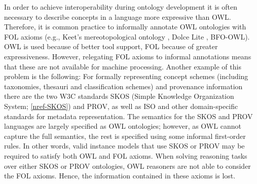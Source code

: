 \documentclass[10pt, a4paper]{isov2}
\renewcommand{\noterefname}{note}
\renewcommand{\nref}[1]{\noterefname~\ref{#1}}
\renewcommand{\nref}[1]{\ref{nref-#1}}
\begin{document}
In order to achieve interoperability during ontology development it is often necessary to describe
concepts in a language more expressive than OWL.  Therefore, it is common practice to informally
annotate OWL ontologies with FOL axioms (e.g., Keet's mereotopological ontology \cite{KeetEtAl12},
Dolce Lite \cite{dolce-web}, BFO-OWL). OWL is used because of better tool support, FOL because of
greater expressiveness. However, relegating FOL axioms to  informal annotations means that these
are not available for machine processing.  Another example of this problem is the following: For
formally representing concept schemes (including taxonomies, thesauri and classification schemes)
and provenance information there are the two W3C standards SKOS (Simple Knowledge Organization
System; \nref{SKOS}) and PROV, as well as ISO and other domain-specific  standards for
metadata representation. The semantics for the SKOS and PROV languages are largely specified as OWL
ontologies; however, as OWL cannot capture the full semantics, the rest is specified using some
informal first-order rules. In other words, valid instance models that use SKOS or PROV may be
required to satisfy both OWL and FOL axioms. When solving reasoning tasks over either SKOS or PROV
ontologies, OWL reasoners are not able to consider the  FOL axioms. Hence, the information
contained in these axioms is lost.
\end{document}
